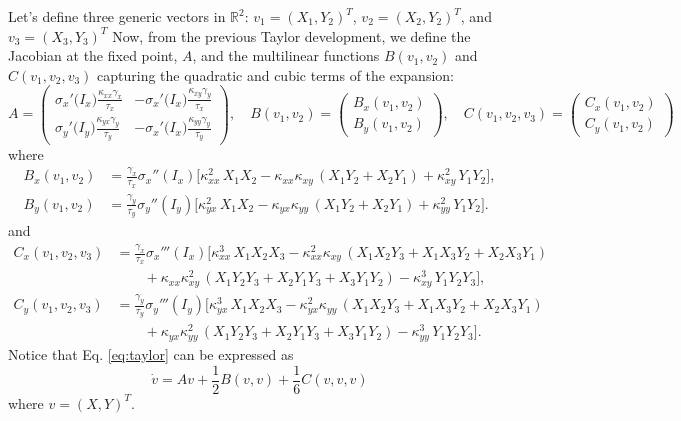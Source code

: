 Let's define three generic vectors in $\mathbb{R}^2$: $v_1 = (X_1,Y_2)^T$, $v_2=(X_2,Y_2)^T$, and $v_3=(X_3,Y_3)^T$ 
Now, from the previous Taylor development, we define the Jacobian at the fixed point, $A$, and the multilinear functions $B(v_1,v_2)$ and $C(v_1,v_2,v_3)$ capturing the quadratic and cubic terms of the expansion:
\begin{equation}
A = 
    \begin{pmatrix}
    \sigma_x'\!\bigl(I_x \bigr)\frac{\kappa_{xx}\gamma_x}{\tau_x} & - \sigma_x'\!\bigl(I_x \bigr)\frac{\kappa_{xy}\gamma_y}{\tau_x}\\[5pt]
    \sigma_y'\!\bigl(I_y \bigr)\frac{\kappa_{yx}\gamma_y}{\tau_y}   & - \sigma_x'\!\bigl(I_x \bigr)\frac{\kappa_{yy}\gamma_y}{\tau_y}
    \end{pmatrix},\quad
B(v_1,v_2) =
    \begin{pmatrix}
    B_x(v_1,v_2)\\[5pt]
    B_y(v_1,v_2)
    \end{pmatrix}
    ,\quad
C(v_1,v_2,v_3) =
    \begin{pmatrix}
    C_x(v_1,v_2)\\[5pt]
    C_y(v_1,v_2)
    \end{pmatrix}
\end{equation}
where
\begin{equation}
\begin{aligned}
B_x(v_1,v_2) &= \frac{\gamma_x}{\tau_x}\sigma_x''(I_x)\Big[
\kappa_{xx}^2\,X_1X_2
- \kappa_{xx}\kappa_{xy}\,(X_1Y_2+X_2Y_1)
+ \kappa_{xy}^2\,Y_1Y_2
\Big],\\[6pt]
B_y(v_1,v_2) &=  \frac{\gamma_y}{\tau_y}\sigma_y''(I_y)\Big[
\kappa_{yx}^2\,X_1X_2
- \kappa_{yx}\kappa_{yy}\,(X_1Y_2+X_2Y_1)
+ \kappa_{yy}^2\,Y_1Y_2
\Big].
\end{aligned}
\end{equation}
and
\begin{equation}
\begin{aligned}
C_x(v_1,v_2,v_3) &= 
\frac{\gamma_x}{\tau_x}\sigma_x'''(I_x)\Big[
\kappa_{xx}^3\,X_1X_2X_3
- \kappa_{xx}^2\kappa_{xy}\,(X_1X_2Y_3+X_1X_3Y_2+X_2X_3Y_1)\\
&\qquad
+ \kappa_{xx}\kappa_{xy}^2\,(X_1Y_2Y_3+X_2Y_1Y_3+X_3Y_1Y_2)
- \kappa_{xy}^3\,Y_1Y_2Y_3
\Big],\\[6pt]
C_y(v_1,v_2,v_3) &= 
\frac{\gamma_y}{\tau_y}\sigma_y'''(I_y)\Big[
\kappa_{yx}^3\,X_1X_2X_3
- \kappa_{yx}^2\kappa_{yy}\,(X_1X_2Y_3+X_1X_3Y_2+X_2X_3Y_1)\\
&\qquad
+ \kappa_{yx}\kappa_{yy}^2\,(X_1Y_2Y_3+X_2Y_1Y_3+X_3Y_1Y_2)
- \kappa_{yy}^3\,Y_1Y_2Y_3
\Big].
\end{aligned}
\end{equation}
Notice that Eq. \eqref{eq:taylor} can be expressed as
\begin{equation}
    \dot v = Av + \frac{1}{2}B(v,v) + \frac{1}{6}C(v,v,v)
\end{equation}
where $v=(X,Y)^T$.

